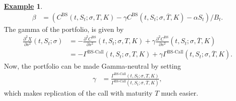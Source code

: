 \documentclass[12pt]{book}
\numberwithin{equation}{chapter}
\theoremstyle{plain}
\numberwithin{theorem}{section}
\theoremstyle{definition}
\newtheorem{example}[theorem]{\underline{Example}}
\numberwithin{exercise}{chapter}
\newcommand{\<}{\langle}
\renewcommand{\>}{\rangle}
\renewcommand{\(}{\left(}
\renewcommand{\)}{\right)}
\renewcommand{\[}{\left[}
\renewcommand{\]}{\right]}
\newcommand\sig{\sigma}
\newcommand\gam{\gamma}
\newcommand\Gam{\Gamma}
\newcommand\Tb{\overline{T}}
\renewcommand\d{\partial}
\newcommand\BS{\textrm{BS}}
\theoremstyle{definition}
\numberwithin{question}{section}
\begin{document}
\begin{example}
\begin{align}
\beta
	&=	( C^\text{BS}(t,S_t;\sig,T,K) - \gam C^\text{BS}(t,S_t;\sig,\Tb,K)  - \alpha S_t ) / B_t .
\end{align}
The gamma of the portfolio, is given by
\begin{align}
\frac{\d^2 X}{\d s^2}(t,S_t;\sig)
	&=	- \frac{\d^2 C^\BS}{\d s^2}(t,S_t;\sig,T,K) + \gam \frac{\d^2 C^\BS}{\d s^2}(t,S_t;\sig,\Tb,K) \\
	&=	- \Gam^\text{BS-Call}(t,S_t;\sig,T,K) + \gam \Gam^\text{BS-Call}(t,S_t;\sig,\Tb,K) .
\end{align}
Now, the portfolio can be made Gamma-neutral by setting
\begin{align}
\gam
	&= \frac{ \Gam^\text{BS-Call}(t,S_t;\sig,T,K) }{ \Gam^\text{BS-Call}(t,S_t;\sig,\Tb,K) } ,
\end{align}
which makes replication of the call with maturity $T$ much easier.
\end{example}
\end{document}
